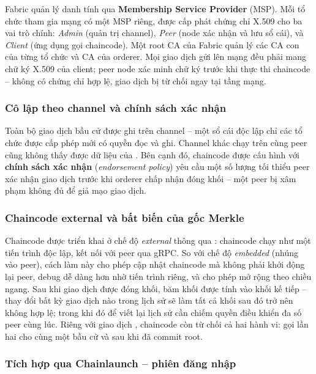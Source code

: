 Fabric quản lý danh tính qua \textbf{Membership Service Provider} (MSP). Mỗi tổ chức tham gia mạng có một MSP riêng, được cấp phát chứng chỉ X.509 cho ba vai trò chính: \textit{Admin} (quản trị channel), \textit{Peer} (node xác nhận và lưu sổ cái), và \textit{Client} (ứng dụng gọi chaincode). Một root CA của Fabric quản lý các CA con của từng tổ chức và CA của orderer. Mọi giao dịch gửi lên mạng đều phải mang chữ ký X.509 của client; peer node xác minh chữ ký trước khi thực thi chaincode -- không có chứng chỉ hợp lệ, giao dịch bị từ chối ngay tại tầng mạng.

\subsubsection{Cô lập theo channel và chính sách xác nhận}

Toàn bộ giao dịch bầu cử được ghi trên channel  -- một sổ cái độc lập chỉ các tổ chức được cấp phép mới có quyền đọc và ghi. Channel khác chạy trên cùng peer cũng không thấy được dữ liệu của . Bên cạnh đó, chaincode  được cấu hình với \textbf{chính sách xác nhận} (\textit{endorsement policy}) yêu cầu một số lượng tối thiểu peer xác nhận giao dịch trước khi orderer chấp nhận đóng khối -- một peer bị xâm phạm không đủ để giả mạo giao dịch.

\subsubsection{Chaincode external và bất biến của gốc Merkle}

Chaincode được triển khai ở chế độ \textit{external} thông qua : chaincode chạy như một tiến trình độc lập, kết nối với peer qua gRPC. So với chế độ \textit{embedded} (nhúng vào peer), cách làm này cho phép cập nhật chaincode mà không phải khởi động lại peer, debug dễ dàng hơn nhờ tiến trình riêng, và cho phép mở rộng theo chiều ngang. Sau khi giao dịch  được đóng khối, băm khối được tính vào khối kế tiếp -- thay đổi bất kỳ giao dịch nào trong lịch sử sẽ làm tất cả khối sau đó trở nên không hợp lệ; trong khi đó để viết lại lịch sử cần chiếm quyền điều khiển đa số peer cùng lúc. Riêng với giao dịch , chaincode còn từ chối cả hai hành vi: gọi  lần hai cho cùng một bầu cử và  sau khi đã commit root.

\subsubsection{Tích hợp qua Chainlaunch -- phiên đăng nhập}

